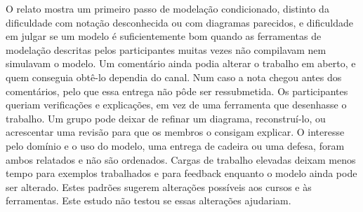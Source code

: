 O relato mostra um primeiro passo de modelação condicionado, distinto da dificuldade com notação desconhecida ou com diagramas parecidos, e dificuldade em julgar se um modelo é suficientemente bom quando as ferramentas de modelação descritas pelos participantes muitas vezes não compilavam nem simulavam o modelo. Um comentário ainda podia alterar o trabalho em aberto, e quem conseguia obtê-lo dependia do canal. Num caso a nota chegou antes dos comentários, pelo que essa entrega não pôde ser ressubmetida. Os participantes queriam verificações e explicações, em vez de uma ferramenta que desenhasse o trabalho. Um grupo pode deixar de refinar um diagrama, reconstruí-lo, ou acrescentar uma revisão para que os membros o consigam explicar. O interesse pelo domínio e o uso do modelo, uma entrega de cadeira ou uma defesa, foram ambos relatados e não são ordenados. Cargas de trabalho elevadas deixam menos tempo para exemplos trabalhados e para feedback enquanto o modelo ainda pode ser alterado. Estes padrões sugerem alterações possíveis aos cursos e às ferramentas. Este estudo não testou se essas alterações ajudariam.

